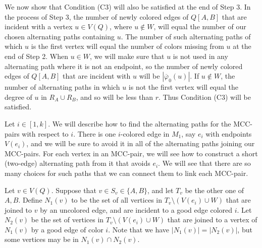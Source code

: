 \documentclass[11pt, oneside]{article}
\newcommand{\pbar}{\overline{\varphi}}
\begin{document}
We  now show that Condition (C3)  will also be satisfied at the end of Step 3. In the process of Step 3,   the number of newly colored edges of $Q[A, B]$ that are incident with a vertex   $u\in V(Q)$, where $u \not\in W$,   will equal  the number of our chosen alternating paths containing $u$. The number of such alternating paths of which $u$ is the first vertex will equal the number of colors missing from $u$ at the end of Step 2. When $u\in W$, we will make sure that $u$ is not used in any alternating path where it is not an endpoint, so the number of newly colored edges of $Q[A, B]$ that are incident with $u$
will be $|\pbar_0(u)|$.  If $u\not\in W$,  the number of alternating paths in which $u$ is not the first  vertex will  equal  the degree of $u$ in $R_A\cup R_B$, and so will be less than $r$. Thus Condition (C3)   will be satisfied. 

Let $i\in[1,k]$. We will describe how to find the alternating paths for the MCC-pairs with respect to $i$. There is one $i$-colored edge in $M_1$, say $e_i$ with endpoints $V(e_i)$, and we will be sure to avoid it in all of the alternating paths joining our MCC-pairs. For each vertex in an MCC-pair, we will see how to construct a short (two-edge) alternating path from it that avoids $e_i$. We will see that there are so many choices for such paths that we can connect them to link each MCC-pair. 

Let $v\in V(Q)$. Suppose that $v\in S_v\in\{A, B\}$, and let $T_v$ be the other one of $A, B$. Define $N_1(v)$ to be the set of all vertices in $T_v\setminus (V(e_i)\cup  W)$ that are joined to $v$ by an uncolored edge, and are incident to a good edge colored $i$.  Let $N_2(v)$ be the set of vertices in $T_v\setminus (V(e_i)\cup W)$ that are joined to a vertex of $N_1(v)$ by a good edge of color $i$. Note that we have $|N_1(v)|=|N_2(v)|$, but some vertices may be in $N_1(v)\cap N_2(v)$. 
\end{document}
